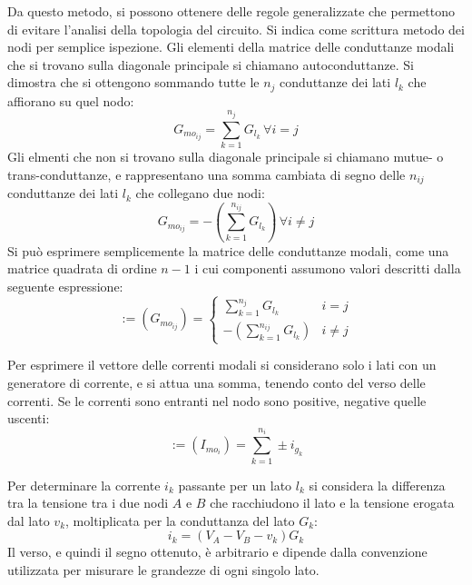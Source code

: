 \documentclass{article}
\numberwithin{equation}{subsection}
\begin{document}
Da questo metodo, si possono ottenere delle regole generalizzate che permettono di evitare l'analisi della topologia del circuito. Si indica come scrittura metodo dei nodi 
per semplice ispezione. Gli elementi della matrice delle conduttanze modali che si trovano sulla diagonale principale si chiamano autoconduttanze. Si dimostra che si ottengono 
sommando tutte le $n_{j}$ conduttanze dei lati $l_k$ che affiorano su quel nodo: 
\begin{equation*}
    G_{{mo}_{ij}}=\displaystyle\sum_{k=1}^{n_j}G_{l_k}\,\forall i= j
\end{equation*}
Gli elmenti che non si trovano sulla diagonale principale si chiamano mutue- o trans-conduttanze, e rappresentano una somma cambiata di segno delle $n_{ij}$ conduttanze dei lati 
$l_k$ che collegano due nodi:
\begin{equation*}
    G_{{mo}_{ij}}=-\displaystyle\left(\sum_{k=1}^{n_{ij}}G_{l_k}\right)\,\forall i\neq j
\end{equation*}
Si può esprimere semplicemente la matrice delle conduttanze modali, come una matrice quadrata di ordine $n-1$ i cui componenti assumono valori descritti dalla seguente 
espressione: 
\begin{equation*}
    [G_{mo}]:=(G_{{mo}_{ij}})=\begin{cases}
        \displaystyle\sum_{k=1}^{n_j}G_{l_k} &i=j\\
        -\displaystyle\left(\sum_{k=1}^{n_{ij}}G_{l_k}\right)&i\neq j
    \end{cases}
\end{equation*}

Per esprimere il vettore delle correnti modali si considerano solo i lati con un generatore di corrente, e si attua una somma, tenendo conto del verso delle correnti. 
Se le correnti sono entranti nel nodo sono positive, negative quelle uscenti: 
\begin{equation*}
    [I_{mo}]:=(I_{{mo}_{i}})=\displaystyle\sum_{k=1}^{n_i}\pm i_{g_k}
\end{equation*}


Per determinare la corrente $i_k$ passante per un lato $l_k$ si considera la differenza tra la tensione tra i due nodi $A$ e $B$ che racchiudono il lato e la tensione erogata dal 
lato $v_k$, moltiplicata per la conduttanza del lato $G_k$:
\begin{equation*}
    i_k=(V_A-V_B-v_k)G_k
\end{equation*}
Il verso, e quindi il segno ottenuto, è arbitrario e dipende dalla convenzione utilizzata per misurare le grandezze di ogni singolo lato. 
\end{document}
